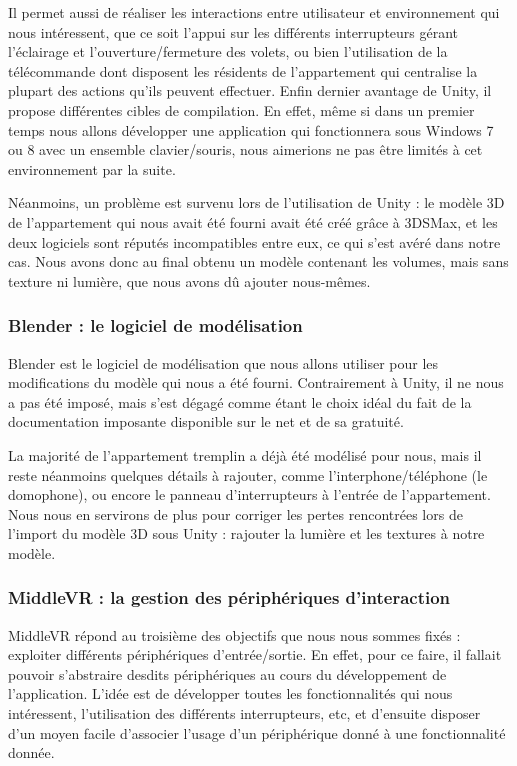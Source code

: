 Il permet aussi de réaliser les interactions entre utilisateur et environnement qui nous intéressent, que ce soit l'appui sur les différents interrupteurs gérant l'éclairage et l'ouverture/fermeture des volets, ou bien l'utilisation de la télécommande dont disposent les résidents de l'appartement qui centralise la plupart des actions qu'ils peuvent effectuer.
Enfin dernier avantage de Unity, il propose différentes cibles de compilation. En effet, même si dans un premier temps nous allons développer une application qui fonctionnera sous Windows 7 ou 8 avec un ensemble clavier/souris, nous aimerions ne pas être limités à cet environnement par la suite. \newline

Néanmoins, un problème est survenu lors de l'utilisation de Unity : le modèle 3D de l'appartement qui nous avait été fourni avait été créé grâce à 3DSMax, et les deux logiciels sont réputés incompatibles entre eux, ce qui s'est avéré dans notre cas. Nous avons donc au final obtenu un modèle contenant les volumes, mais sans texture ni lumière, que nous avons dû ajouter nous-mêmes.

\subsubsection{Blender : le logiciel de modélisation}
Blender est le logiciel de modélisation que nous allons utiliser pour les modifications du modèle qui nous a été fourni. Contrairement à Unity, il ne nous a pas été imposé, mais s'est dégagé comme étant le choix idéal du fait de la documentation imposante disponible sur le net et de sa gratuité.\newline

La majorité de l'appartement tremplin a déjà été modélisé pour nous, mais il reste néanmoins quelques détails à rajouter, comme l'interphone/téléphone (le domophone), ou encore le panneau d'interrupteurs à l'entrée de l'appartement. Nous nous en servirons de plus pour corriger les pertes rencontrées lors de l'import du modèle 3D sous Unity : rajouter la lumière et les textures à notre modèle.

\subsubsection{MiddleVR : la gestion des périphériques d'interaction}

MiddleVR répond au troisième des objectifs que nous nous sommes fixés : exploiter différents périphériques d'entrée/sortie. En effet, pour ce faire, il fallait pouvoir s'abstraire desdits périphériques au cours du développement de l'application. L'idée est de développer toutes les fonctionnalités qui nous intéressent, l'utilisation des différents interrupteurs, etc, et d'ensuite disposer d'un moyen facile d'associer l'usage d'un périphérique donné à une fonctionnalité donnée.\newline

